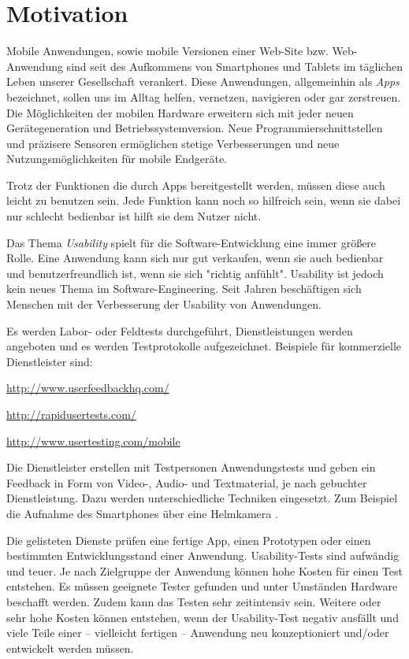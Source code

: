\section{Motivation}
\label{motivation}

Mobile Anwendungen, sowie mobile Versionen einer Web-Site bzw. Web-Anwendung sind seit des Aufkommens von Smartphones und Tablets im täglichen Leben unserer Gesellschaft verankert. 
Diese Anwendungen, allgemeinhin als \textit{Apps} bezeichnet, sollen uns im Alltag helfen, vernetzen, navigieren oder gar zerstreuen. 
Die Möglichkeiten der mobilen Hardware erweitern sich mit jeder neuen Gerätegeneration und Betriebssystemversion. 
Neue Programmierschnittstellen und präzisere Sensoren ermöglichen stetige Verbesserungen und neue Nutzungsmöglichkeiten für mobile Endgeräte. 

Trotz der Funktionen die durch Apps bereitgestellt werden, müssen diese auch leicht zu benutzen sein. 
Jede Funktion kann noch so hilfreich sein, wenn sie dabei nur schlecht bedienbar ist hilft sie dem Nutzer nicht.

Das Thema \textit{Usability} spielt für die Software-Entwicklung eine immer größere Rolle. 
Eine Anwendung kann sich nur gut verkaufen, wenn sie auch bedienbar und benutzerfreundlich ist, wenn sie sich "richtig anfühlt". 
Usability ist jedoch kein neues Thema im Software-Engineering.
Seit Jahren beschäftigen sich Menschen mit der Verbesserung der Usability von Anwendungen.

Es werden Labor- oder Feldtests durchgeführt, Dienstleistungen werden angeboten und es werden Testprotokolle aufgezeichnet. Beispiele für kommerzielle Dienstleister sind: 

\begin{compactitem}
    \item{\url{http://www.userfeedbackhq.com/}}
    \item{\url{http://rapidusertests.com/}}
    \item{\url{http://www.usertesting.com/mobile}}
\end{compactitem}

Die Dienstleister erstellen mit Testpersonen Anwendungstests und geben ein Feedback in Form von Video-, Audio- und Textmaterial, je nach gebuchter Dienstleistung. 
Dazu werden unterschiedliche Techniken eingesetzt. 
Zum Beispiel die Aufnahme des Smartphones über eine Helmkamera \cite[vgl.][]{usabilityblog_wasBeachten}.

Die gelisteten Dienste prüfen eine fertige App, einen Prototypen oder einen bestimmten Entwicklungsstand einer Anwendung. 
Usability-Tests sind aufwändig und teuer. 
Je nach Zielgruppe der Anwendung können hohe Kosten für einen Test entstehen. 
Es müssen geeignete Tester gefunden und unter Umständen Hardware beschafft werden. 
Zudem kann das Testen sehr zeitintensiv sein. 
Weitere oder sehr hohe Kosten können entstehen, wenn der Usability-Test negativ ausfällt und viele Teile einer -- vielleicht fertigen -- Anwendung neu konzeptioniert und/oder entwickelt werden müssen. 

